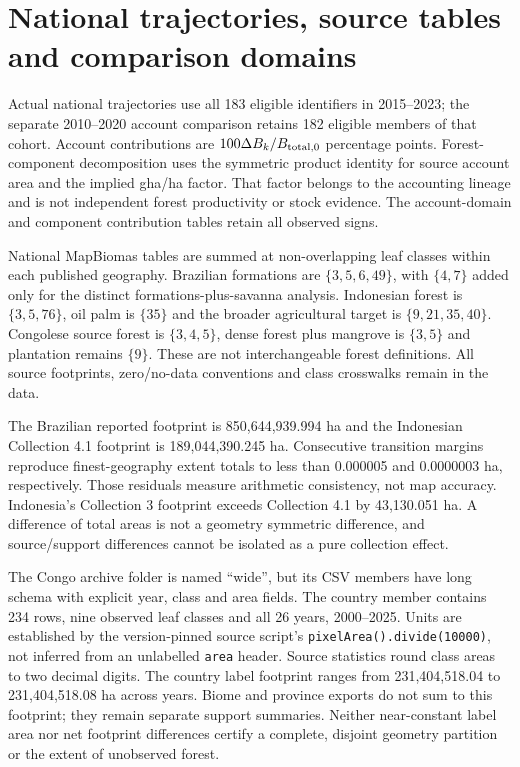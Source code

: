 \section{National trajectories, source tables and comparison domains}\label{sec:SI_national}
Actual national trajectories use all 183 eligible identifiers in 2015--2023; the separate 2010--2020 account comparison retains 182 eligible members of that cohort. Account contributions are $100\Delta B_k/B_{\rm total,0}$ percentage points. Forest-component decomposition uses the symmetric product identity for source account area and the implied gha/ha factor. That factor belongs to the accounting lineage and is not independent forest productivity or stock evidence. The account-domain and component contribution tables retain all observed signs.

National MapBiomas tables are summed at non-overlapping leaf classes within each published geography. Brazilian formations are $\{3,5,6,49\}$, with $\{4,7\}$ added only for the distinct formations-plus-savanna analysis. Indonesian forest is $\{3,5,76\}$, oil palm is $\{35\}$ and the broader agricultural target is $\{9,21,35,40\}$. Congolese source forest is $\{3,4,5\}$, dense forest plus mangrove is $\{3,5\}$ and plantation remains $\{9\}$. These are not interchangeable forest definitions. All source footprints, zero/no-data conventions and class crosswalks remain in the data.

The Brazilian reported footprint is 850,644,939.994 ha and the Indonesian Collection 4.1 footprint is 189,044,390.245 ha. Consecutive transition margins reproduce finest-geography extent totals to less than 0.000005 and 0.0000003 ha, respectively. Those residuals measure arithmetic consistency, not map accuracy. Indonesia's Collection 3 footprint exceeds Collection 4.1 by 43,130.051 ha. A difference of total areas is not a geometry symmetric difference, and source/support differences cannot be isolated as a pure collection effect.

The Congo archive folder is named ``wide'', but its CSV members have long schema with explicit year, class and area fields. The country member contains 234 rows, nine observed leaf classes and all 26 years, 2000--2025. Units are established by the version-pinned source script's \texttt{pixelArea().divide(10000)}, not inferred from an unlabelled \texttt{area} header. Source statistics round class areas to two decimal digits. The country label footprint ranges from 231,404,518.04 to 231,404,518.08 ha across years. Biome and province exports do not sum to this footprint; they remain separate support summaries. Neither near-constant label area nor net footprint differences certify a complete, disjoint geometry partition or the extent of unobserved forest.

